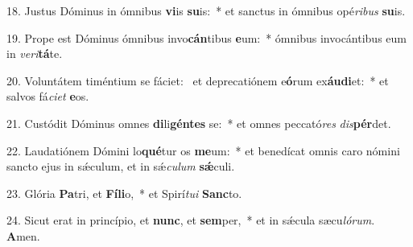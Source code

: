 18. Justus Dóminus in ómnibus \textbf{vi}is \textbf{su}is:~*  et sanctus in ómnibus opé\textit{ri}\textit{bus} \textbf{su}is.\

19. Prope est Dóminus ómnibus invo\textbf{cán}tibus \textbf{e}um:~*  ómnibus invocántibus eum in \textit{ve}\textit{ri}\textbf{tá}te.\

20. Voluntátem timéntium se fáciet: \dag\  et deprecatiónem e\textbf{ó}rum ex\textbf{áu}\textbf{di}et:~*  et salvos fá\textit{ci}\textit{et} \textbf{e}os.\

21. Custódit Dóminus omnes \textbf{di}li\textbf{gén}\textbf{tes} se:~*  et omnes peccató\textit{res} \textit{dis}\textbf{pér}det.\

22. Laudatiónem Dómini lo\textbf{qué}tur os \textbf{me}um:~*  et benedícat omnis caro nómini sancto ejus in sǽculum, et in sǽ\textit{cu}\textit{lum} \textbf{sǽ}culi.\

23. Glória \textbf{Pa}tri, et \textbf{Fí}\textbf{li}o,~*  et Spirí\textit{tu}\textit{i} \textbf{Sanc}to.\

24. Sicut erat in princípio, et \textbf{nunc}, et \textbf{sem}per,~*  et in sǽcula sæcu\textit{ló}\textit{rum}. \textbf{A}men.\


